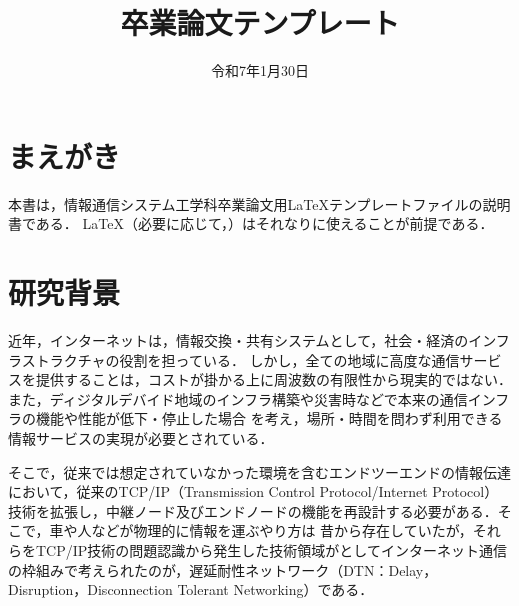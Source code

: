 \documentclass[11pt]{icsthesis}
\title{卒業論文テンプレート}
\date{令和7年1月30日}
\begin{document}
\maketitle
\pagestyle{fancy}
\fancyhead[R]{\nouppercase{\fontsize{10.5pt}{0pt}\selectfont\rightmark}}
\fancyhead[L]{\nouppercase{\fontsize{10.5pt}{0pt}\selectfont\leftmark}}
\fancyfoot[C]{--\ \thepage\ --}
\renewcommand{\headrulewidth}{0.3truemm}
\setcounter{tocdepth}{4}
\pagestyle{fancy}
\fancyfoot[C]{--\ \thepage\ --}
{\makeatletter
\let\ps@jpl@in\ps@empty
\makeatother
\pagestyle{plain}
\tableofcontents
\clearpage}

\chapter{まえがき}
本書は，情報通信システム工学科卒業論文用\LaTeX テンプレートファイルの説明書である．
\LaTeX （必要に応じて，\BibTeX）はそれなりに使えることが前提である．

\chapter{研究背景}
近年，インターネットは，情報交換・共有システムとして，社会・経済のインフラストラクチャの役割を担っている．
しかし，全ての地域に高度な通信サービスを提供することは，コストが掛かる上に周波数の有限性から現実的ではない．
また，ディジタルデバイド地域のインフラ構築や災害時などで本来の通信インフラの機能や性能が低下・停止した場合
を考え，場所・時間を問わず利用できる情報サービスの実現が必要とされている．

そこで，従来では想定されていなかった環境を含むエンドツーエンドの情報伝達において，従来のTCP/IP（Transmission Control Protocol/Internet Protocol）
技術を拡張し，中継ノード及びエンドノードの機能を再設計する必要がある．そこで，車や人などが物理的に情報を運ぶやり方は
昔から存在していたが，それらをTCP/IP技術の問題認識から発生した技術領域がとしてインターネット通信の枠組みで考えられたのが，遅延耐性ネットワーク（DTN：Delay，Disruption，Disconnection Tolerant Networking）である．
\end{document}
